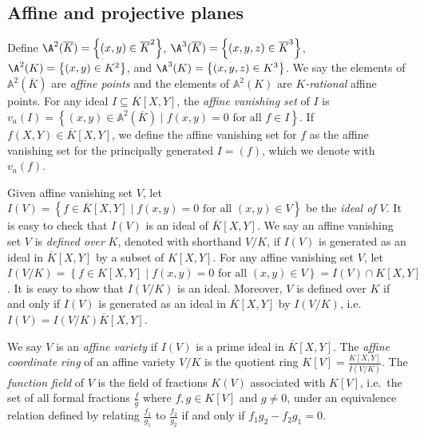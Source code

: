 \documentclass[11pt,letterpaper]{article}
\newcommand{\polys}{K[X,Y]}
\theoremstyle{definition}
\newcommand{\6}{\mathbf}
\newcommand{\7}{\mathcal}
\begin{document}
\subsection{Affine and projective planes}

Define $\A^2(\overline{K}) = \left\{(x,y) \in \overline{K}^2\right\}$, $\A^3(\overline{K}) = \left\{(x,y,z) \in \overline{K}^3\right\}$, $\A^2(K) = \left\{(x,y) \in K^2\right\}$, and $\A^3(K)=\left\{(x,y,z) \in K^3\right\}$.  We say the elements of $\mathbb{A}^2(\overline{K})$ are \textit{affine points} and the elements of $\mathbb{A}^2(K)$ are \textit{$K$-rational} affine points. 
For any ideal $I \subseteq \overline{K}[X,Y]$, the \textit{affine vanishing set} of $I$ is  $v_a(I) = \left\{(x,y) \in \mathbb{A}^2(\overline{K}) \mid f(x,y) = 0\text{ for all } f \in I\right\}$. If $f(X,Y) \in \overline{K}[X,Y]$, we define the affine vanishing set for $f$ as the affine vanishing set for the principally generated $I = (f)$, which we denote with $v_a(f)$.


Given affine vanishing set $V$, let $I(V) = \left\{f \in \overline{K}[X,Y] \mid f(x,y) = 0\text{ for all }(x,y) \in V\right\}$  be the \textit{ideal of $V$}. It is easy to check that $I(V)$ is an ideal of $\overline{K}[X,Y]$.
We say an affine vanishing set $V$ is \textit{defined over} $K$, denoted with shorthand $V/K$, if $I(V)$ is generated as an ideal in $\overline{K}[X,Y]$ by a subset of $K[X,Y]$. 
For any affine vanishing set $V$, let $I(V/K) = \left\{f \in \polys \mid f(x,y) = 0\text{ for all }(x,y) \in V\right\} = I(V) \cap K[X,Y]$. It is easy to show that $I(V/K)$ is an ideal. Moreover, $V$ is defined over $K$ if and only if $I(V)$ is generated as an ideal in $\overline{K}[X,Y]$ by $I(V/K)$, i.e.\ $I(V) = I(V/K)\overline{K}[X,Y]$. 

We say $V$ is an \textit{affine variety} if $I(V)$ is a prime ideal in $\overline{K}[X,Y]$. The \textit{affine coordinate ring} of an affine variety $V/K$ is the quotient ring $K[V] = \frac{K[X,Y]}{I(V/K)}$. The \textit{function field} of $V$ is the field of fractions $K(V)$ associated with $K[V]$, i.e.\ the set of all formal fractions $\frac{f}{g}$ where $f, g \in K[V]$ and $g \neq 0$, under an equivalence relation defined by relating $\frac{f_1}{g_1}$ to $\frac{f_2}{g_2}$ if and only if $f_1 g_2 - f_2 g_1 = 0$.
\end{document}

